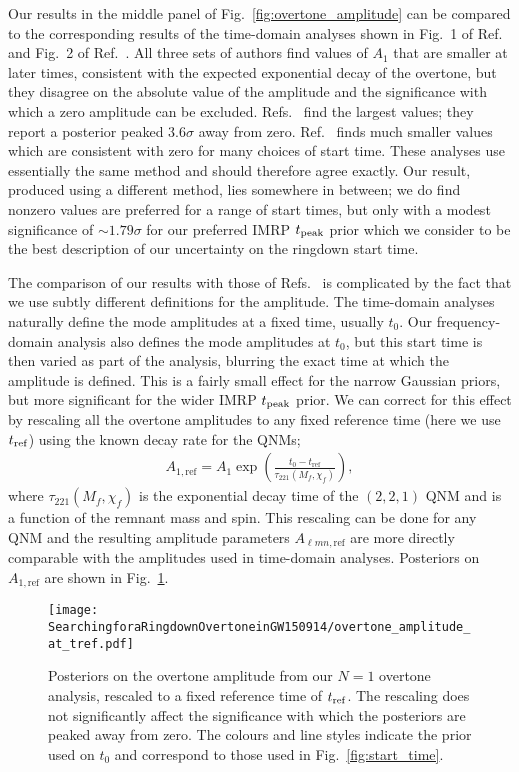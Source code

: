 Our results in the middle panel of Fig.~\ref{fig:overtone_amplitude} can be compared to the corresponding results of the time-domain analyses shown in Fig.~1 of Ref.~\cite{Isi:2022mhy} and Fig.~2 of Ref.~\cite{Cotesta:2022pci}.
All three sets of authors find values of $A_1$ that are smaller at later times, consistent with the expected exponential decay of the overtone, but they disagree on the absolute value of the amplitude and the significance with which a zero amplitude can be excluded.
Refs.~\cite{Isi:2019aib, Isi:2022mhy} find the largest values; they report a posterior peaked $3.6\sigma$ away from zero.
Ref.~\cite{Cotesta:2022pci} finds much smaller values which are consistent with zero for many choices of start time.
These analyses use essentially the same method and should therefore agree exactly.
Our result, produced using a different method, lies somewhere in between; we do find nonzero values are preferred for a range of start times, but only with a modest significance of $\sim 1.79\sigma$ for our preferred IMRP $t_{\rm peak}$ prior which we consider to be the best description of our uncertainty on the ringdown start time.

The comparison of our results with those of Refs.~\cite{Isi:2019aib, Cotesta:2022pci, Isi:2022mhy} is complicated by the fact that we use subtly different definitions for the amplitude. 
The time-domain analyses naturally define the mode amplitudes at a fixed time, usually $t_0$.
Our frequency-domain analysis also defines the mode amplitudes at $t_0$, but this start time is then varied as part of the analysis, blurring the exact time at which the amplitude is defined.
This is a fairly small effect for the narrow Gaussian priors, but more significant for the wider IMRP $t_{\rm peak}$ prior.
We can correct for this effect by rescaling all the overtone amplitudes to any fixed reference time (here we use $t_{\rm ref}$) using the known decay rate for the QNMs;
\begin{align}
	A_{1,\mathrm{ref}} = A_1 \exp\left(\frac{t_0-t_{\mathrm{ref}}}{\tau_{221}(M_f,\chi_f)}\right),
\end{align}
where $\tau_{221}(M_f, \chi_f)$ is the exponential decay time of the $(2,2,1)$ QNM and is a function of the remnant mass and spin.
This rescaling can be done for any QNM and the resulting amplitude parameters $A_{\ell m n,\mathrm{ref}}$ are more directly comparable with the amplitudes used in time-domain analyses.
Posteriors on $A_{1,\mathrm{ref}}$ are shown in  
Fig.~\ref{fig:amp_at_tref}.

\begin{figure}[t]
    \centering
    \texttt{[image: SearchingforaRingdownOvertoneinGW150914/overtone\_amplitude\_at\_tref.pdf]}
    \caption[Posteriors on the GW150914 overtone amplitude, rescaled to a fixed reference time]{ 
    Posteriors on the overtone amplitude from our $N=1$ overtone analysis, rescaled to a fixed reference time of $t_{\rm ref}$.
    The rescaling does not significantly affect the significance with which the posteriors are peaked away from zero.
    The colours and line styles indicate the prior used on $t_0$ and correspond to those used in Fig.~\ref{fig:start_time}.
    }
    \label{fig:amp_at_tref}
\end{figure}

